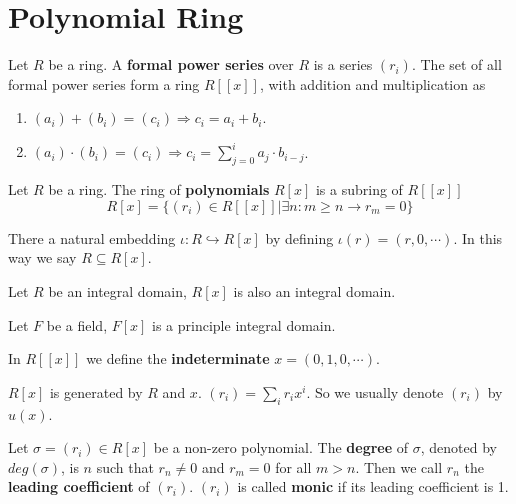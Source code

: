 \documentclass[12pt]{book}
\begin{document}
\section{Polynomial Ring}

\begin{definition}
	Let $R$ be a ring. A {\bf formal power series} over $R$ is a series $(r_i)$. The set of all formal power series form a ring $R[[x]]$, with addition and multiplication as
	\begin{enumerate}
		\item $(a_i)+(b_i)=(c_i)\Rightarrow c_i=a_i+b_i$.
		\item $(a_i)\cdot(b_i)=(c_i)\Rightarrow c_i=\sum_{j=0}^ia_j\cdot b_{i-j}$.
	\end{enumerate}
\end{definition}

\begin{definition}
	Let $R$ be a ring. The ring of {\bf polynomials} $R[x]$ is a subring of $R[[x]]$
	\begin{equation}
		R[x]=\{(r_i)\in R[[x]]|\exists n:m\geq n\rightarrow r_m=0\}
	\end{equation}
\end{definition}

There a natural embedding $\iota:R\hookrightarrow R[x]$ by defining $\iota(r)=(r,0,\cdots)$. In this way we say $R\subseteq R[x]$.

\begin{lemma}
	Let $R$ be an integral domain, $R[x]$ is also an integral domain.
\end{lemma}

\begin{lemma}
	Let $F$ be a field, $F[x]$ is a principle integral domain.
\end{lemma}

\begin{definition}
	In $R[[x]]$ we define the {\bf indeterminate} $x=(0,1,0,\cdots)$.
\end{definition}

\begin{lemma}
	$R[x]$ is generated by $R$ and $x$. $(r_i)=\sum_i r_ix^i$. So we usually denote $(r_i)$ by $u(x)$.
\end{lemma}

\begin{definition}
	Let $\sigma=(r_i)\in R[x]$ be a non-zero polynomial. The {\bf degree} of $\sigma$, denoted by $deg(\sigma)$, is $n$ such that $r_n\neq 0$ and $r_m=0$ for all $m>n$. Then we call $r_n$ the {\bf leading coefficient} of $(r_i)$. $(r_i)$ is called {\bf monic} if its leading coefficient is 1.
\end{definition}
\end{document}
